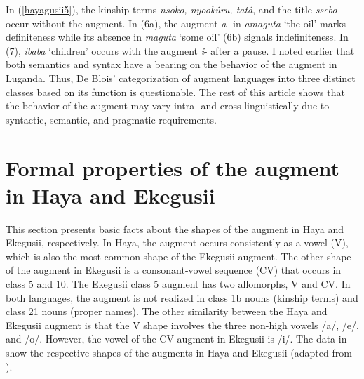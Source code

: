 \documentclass[output=paper]{langscibook}
\begin{document}
In (\ref{hayagusii5}), the kinship terms \textit{nsoko, nyookûru, tatâ}, and the title \textit{ssebo} occur without the augment. In (6a), the augment \textit{a-} in \textit{amaguta} ‘the oil’ marks definiteness while its absence in \textit{maguta} ‘some oil’ (6b) signals indefiniteness. In (7), \textit{ibaba} ‘children’ occurs with the augment \textit{i}- after a pause. I noted earlier that both semantics and syntax have a bearing on the behavior of the augment in Luganda. Thus, De Blois’ categorization of augment languages into three distinct classes based on its function is questionable. The rest of this article shows that the behavior of the augment may vary intra- and cross-linguistically due to syntactic, semantic, and pragmatic requirements.

\section{Formal properties of the augment in Haya and Ekegusii} 
	This section presents basic facts about the shapes of the augment in Haya and Ekegusii, respectively. In Haya, the augment occurs consistently as a vowel (V), which is also the most common shape of the Ekegusii augment. The other shape of the augment in Ekegusii is a consonant-vowel sequence (CV) that occurs in class 5 and 10.  The Ekegusii class 5 augment has two allomorphs, V and CV. In both languages, the augment is not realized in class 1b nouns (kinship terms) and class 21 nouns (proper names). The other similarity between the Haya and Ekegusii augment is that the V shape involves the three non-high vowels /a/, /e/, and /o/. However, the vowel of the CV augment in Ekegusii is /i/.  The data in  show the respective shapes of the augments in Haya \citep[35]{chagas1977} and Ekegusii (adapted from \citealt[199]{cammenga2002phonology}). 
\end{document}
